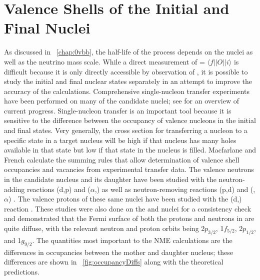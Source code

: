 \section{Valence Shells of the Initial and Final Nuclei}
\label{sec:valence}

As discussed in {\chap}~\ref{chap:0vbb}, the half-life of the \zvbb process depends on the nuclei as well as the neutrino mass scale.  While a direct measurement of \NME = $\langle f||O||i \rangle$ is difficult because it is only directly accessible by observation of \zvbb, it is possible to study the initial and final nuclear states separately in an attempt to improve the accuracy of the calculations.  Comprehensive single-nucleon transfer experiments have been performed on many of the candidate nuclei; see \citep{schiffer_review} for an overview of current progress.  Single-nucleon transfer is an important tool because it is sensitive to the difference between the occupancy of valence nucleons in the initial and final states.  Very generally, the cross section for transferring a nucleon to a specific state in a target nucleus will be high if that nucleus has many holes available in that state but low if that state in the nucleus is filled.  Macfarlane and French \citep{sumRules} calculate the summing rules that allow determination of valence shell occupancies and vacancies from experimental transfer data.  The valence neutrons in the candidate nucleus  and its daughter  have been studied with the neutron-adding reactions (d,p) and ($\alpha$,) as well as neutron-removing reactions (p,d) and (,$\alpha$) \citep{valenceNeutrons}.  The valence protons of these same nuclei have been studied with the (d,) reaction \citep{valenceProtons}.  These studies were also done on the  and  nuclei for a consistency check and demonstrated that the Fermi surface of both the protons and neutrons in \GeTargets are quite diffuse, with the relevant neutron and proton orbits being 2$p_{3/2}$, 1$f_{5/2}$, 2$p_{1/2}$, and 1$g_{9/2}$.  The quantities most important to the NME calculations are the differences in occupancies between the mother and daughter nucleus; these differences are shown in {\fig}~\ref{fig:occupancyDiffs} along with the theoretical predictions.
